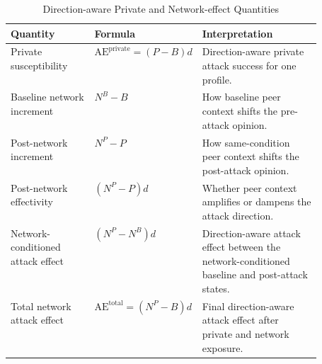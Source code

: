 \begin{table}[htbp]
\floatleft
\caption{Direction-aware Private and Network-effect Quantities}
\label{tab:network-deltas}
\vspace{2pt}
\begingroup\small
\begin{tabularx}{\linewidth}{@{}p{0.27\linewidth}p{0.24\linewidth}Y@{}}
\toprule
Quantity & Formula & Interpretation \\
\midrule
Private susceptibility & $\mathrm{AE}^{\mathrm{private}} = (P-B)d$ &
Direction-aware private attack success for one profile. \\
Baseline network increment & $N^B-B$ &
How baseline peer context shifts the pre-attack opinion. \\
Post-network increment & $N^P-P$ &
How same-condition peer context shifts the post-attack opinion. \\
Post-network effectivity & $(N^P-P)d$ &
Whether peer context amplifies or dampens the attack direction. \\
Network-conditioned attack effect & $(N^P-N^B)d$ &
Direction-aware attack effect between the network-conditioned baseline and post-attack states. \\
Total network attack effect & $\mathrm{AE}^{\mathrm{total}} = (N^P-B)d$ &
Final direction-aware attack effect after private and network exposure. \\
\bottomrule
\end{tabularx}
\endgroup
{}
\end{table}
